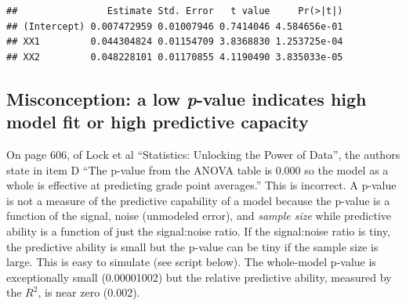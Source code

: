 \documentclass[]{book}
\newenvironment{Shaded}{\begin{snugshade}}{\end{snugshade}}
\newcommand{\DataTypeTok}[1]{\textcolor[rgb]{0.13,0.29,0.53}{#1}}
\newcommand{\DecValTok}[1]{\textcolor[rgb]{0.00,0.00,0.81}{#1}}
\newcommand{\FloatTok}[1]{\textcolor[rgb]{0.00,0.00,0.81}{#1}}
\newcommand{\KeywordTok}[1]{\textcolor[rgb]{0.13,0.29,0.53}{\textbf{#1}}}
\newcommand{\NormalTok}[1]{#1}
\newcommand{\OperatorTok}[1]{\textcolor[rgb]{0.81,0.36,0.00}{\textbf{#1}}}
\newcommand{\StringTok}[1]{\textcolor[rgb]{0.31,0.60,0.02}{#1}}
\begin{document}
\begin{verbatim}
##                Estimate Std. Error   t value     Pr(>|t|)
## (Intercept) 0.007472959 0.01007946 0.7414046 4.584656e-01
## XX1         0.044304824 0.01154709 3.8368830 1.253725e-04
## XX2         0.048228101 0.01170855 4.1190490 3.835033e-05
\end{verbatim}

\hypertarget{misconception-a-low-p-value-indicates-high-model-fit-or-high-predictive-capacity}{%
\subsection{\texorpdfstring{Misconception: a low \emph{p}-value indicates high model fit or high predictive capacity}{Misconception: a low p-value indicates high model fit or high predictive capacity}}\label{misconception-a-low-p-value-indicates-high-model-fit-or-high-predictive-capacity}}

On page 606, of Lock et al ``Statistics: Unlocking the Power of Data'', the authors state in item D ``The p-value from the ANOVA table is 0.000 so the model as a whole is effective at predicting grade point averages.'' This is incorrect. A p-value is not a measure of the predictive capability of a model because the p-value is a function of the signal, noise (unmodeled error), and \emph{sample size} while predictive ability is a function of just the signal:noise ratio. If the signal:noise ratio is tiny, the predictive ability is small but the p-value can be tiny if the sample size is large. This is easy to simulate (see script below). The whole-model p-value is exceptionally small (0.00001002) but the relative predictive ability, measured by the \(R^2\), is near zero (0.002).

\begin{Shaded}
\end{Shaded}
\end{document}
